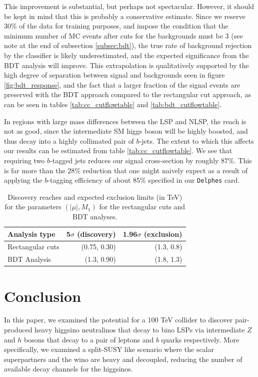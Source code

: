 This improvement is substantial, but perhaps not spectacular. However, it should be kept in mind that this is probably a conservative estimate. Since we reserve 30\% of the data for training purposes, and impose the condition that the minimum number of MC events after cuts for the backgrounds must be 3 (see note at the end of subsection \ref{subsec:bdt}), the true rate of background rejection by the classifier is likely underestimated, and the expected significance from the BDT analysis will improve. This extrapolation is qualitatively supported by the high degree of separation between signal and backgrounds seen in figure \ref{fig:bdt_response}, and the fact that a larger fraction of the signal events are preserved with the BDT approach compared to the rectangular cut approach, as can be seen in tables \ref{tab:cc_cutflowtable} and \ref{tab:bdt_cutflowtable}. 

In regions with large mass differences between the LSP and NLSP, the reach is not as good, since the intermediate SM higgs boson will be highly boosted, and thus decay into a highly collimated pair of $b$-jets. The extent to which this affects our results can be estimated from table \ref{tab:cc_cutflowtable}. We see that requiring two $b$-tagged jets reduces our signal cross-section by roughly 87\%. This is far more than the 28\% reduction that one might naively expect as a result of applying the $b$-tagging efficiency of about 85\% specified in our \texttt{Delphes} card. 

\begin{table}[h]
\centering
\begin{tabular}{l|rr}
\toprule
Analysis type & 5$\sigma$ (discovery)& 1.96$\sigma$ (exclusion)\\
\midrule
Rectangular cuts & (0.75, 0.30) & (1.3, 0.8)\\
BDT Analysis & (1.3, 0.90) & (1.8, 1.3)\\
\bottomrule
\end{tabular}
\caption{Discovery reaches and expected exclusion limits (in TeV) for the parameters $(|\mu|,M_1)$ for the rectangular cuts and BDT analyses.}
\label{tab:summary}
\end{table}

\section{Conclusion}\label{sec:conclusion}

In this paper, we examined the potential for a 100 TeV collider to discover pair-produced heavy higgsino neutralinos that decay to bino LSPs via intermediate $Z$ and $h$ bosons that decay to a pair of leptons and $b$ quarks respectively.  More specifically, we examined a split-SUSY like scenario where the scalar superpartners and the wino are heavy and decoupled, reducing the number of available decay channels for the higgsinos.

